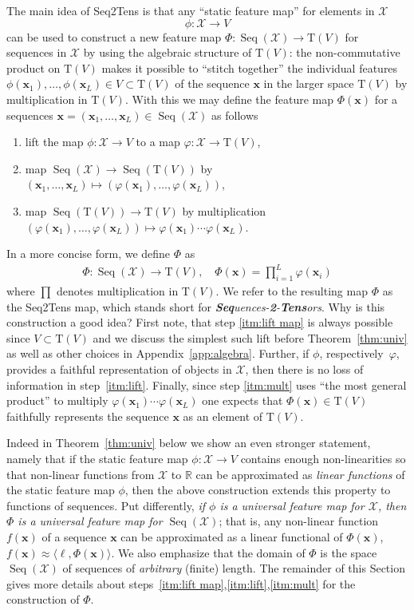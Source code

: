 \documentclass{article} \usepackage{iclr2021_conference,times}
\newcommand{\R}{\mathbb{R}}
\newcommand{\bx}{\mathbf{x}}
\newcommand{\cX}{\mathcal{X}}
\newcommand{\T}[1]{\mathrm{T}({#1})}
\newcommand{\Seq}[1]{\operatorname{Seq}(#1)}
\theoremstyle{plain}
\theoremstyle{definition}
\begin{document}
The main idea of Seq2Tens is that any ``static feature map'' for elements in $\cX$
\[
  \phi: \cX \to V
\]
can be used to construct a new feature map $\Phi:\Seq{\cX} \rightarrow \T{V}$ for sequences in $\cX$ by using the algebraic structure of $\T{V}$: 
the non-commutative product on $ \T{V} $ makes it possible to ``stitch together'' the individual features $\phi(\bx_1),\ldots,\phi(\bx_L) \in V \subset \T{V}$ of the sequence $\bx$ in the larger space $\T{V}$ by multiplication in $\T{V}$.
With this we may define the feature map $\Phi(\bx)$ for a sequences $\bx=(\bx_1,\ldots,\bx_L) \in \Seq{\cX}$ as follows 
\begin{enumerate}[label=(\roman*)]
\item\label{itm:lift map}
  lift the map $\phi:\cX \to V$ to a map $\varphi: \cX \to \T{V}$,
	\item \label{itm:lift}
	map $\Seq{\cX } \to \Seq{\T{V}}$ by $(\bx_1,\ldots,\bx_L) \mapsto (\varphi(\bx_1),\ldots,\varphi(\bx_L))$, 
	\item \label{itm:mult}
    map $\Seq{\T{V}} \to \T{V}$ by multiplication $(\varphi(\bx_1),\ldots,\varphi(\bx_L)) \mapsto \varphi(\bx_1)\cdots \varphi(\bx_L)$. 
\end{enumerate}
In a more concise form, we define $\Phi$ as
\begin{align}
 \Phi: \Seq{\cX} \to \T{V},\quad \Phi(\bx)=\prod_{i=1}^L \varphi(\bx_i) \label{eq:mult_varphi}
\end{align}
where $\prod$ denotes multiplication in $\T{V}$.
We refer to the resulting map $\Phi$ as the Seq2Tens map, which stands short for \textit{\textbf{Seq}uences-\textbf{2}-\textbf{Tens}ors}.
Why is this construction a good idea?
First note, that step \ref{itm:lift map} is always possible since $V\subset \T{V}$ and we discuss the simplest such lift before Theorem~\ref{thm:univ} as well as other choices in Appendix~\ref{app:algebra}. 
Further, if $\phi$, respectively~$\varphi$, provides a faithful representation of objects in $\cX$, then there is no loss of information in step~\ref{itm:lift}.
Finally, since step \ref{itm:mult} uses ``the most general product'' to multiply $\varphi(\bx_1)\cdots \varphi(\bx_L)$ one expects that $\Phi(\bx) \in \T{V}$ faithfully represents the sequence $\bx$ as an element of $\T{V}$.


Indeed in Theorem~\ref{thm:univ} below we show an even stronger statement, namely that if the static feature map $\phi:\cX \to V$ contains enough non-linearities so that non-linear functions from $\cX $ to $\R$ can be approximated as \emph{linear functions} of the static feature map $\phi$, then the above construction extends this property to functions of sequences.
Put differently, \emph{if $\phi$ is a universal feature map for $\cX$, then $\Phi$ is a universal feature map for $\Seq{\cX}$};
that is, any non-linear function $f(\bx)$ of a sequence $\bx$ can be approximated as a linear functional of $\Phi(\bx)$,  $f(\bx) \approx \langle \ell, \Phi(\bx) \rangle$.  
We also emphasize that the domain of $\Phi$ is the space $\Seq{\cX}$ of sequences of \emph{arbitrary} (finite) length.
The remainder of this Section gives more details about steps~\ref{itm:lift map},\ref{itm:lift},\ref{itm:mult} for the construction of $\Phi$. 
\end{document}
